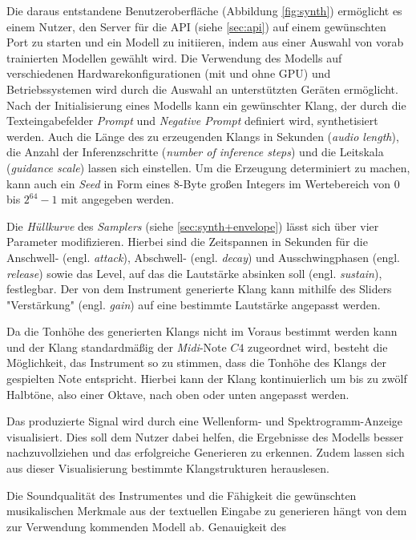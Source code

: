 \documentclass[
  a4paper,  %
  twoside,  %
  bibliography=totoc,
  headsepline,
  cleardoublepage=empty,
  parskip=half,
  draft=false
]{scrbook}
\begin{document}
Die daraus entstandene Benutzeroberfläche (Abbildung \ref{fig:synth}) ermöglicht es einem Nutzer, den Server für die API (siehe \ref{sec:api}) auf einem gewünschten Port  zu starten und ein Modell zu initiieren, indem aus einer Auswahl von vorab trainierten Modellen gewählt wird. Die Verwendung des Modells auf verschiedenen Hardwarekonfigurationen (mit und ohne GPU) und Betriebssystemen wird durch die Auswahl an unterstützten Geräten ermöglicht. Nach der Initialisierung eines Modells kann ein gewünschter Klang, der durch die Texteingabefelder \emph{Prompt} und \emph{Negative Prompt} definiert wird, synthetisiert werden. Auch die Länge des zu erzeugenden Klangs in Sekunden (\emph{audio length}), die Anzahl der Inferenzschritte (\emph{number of inference steps}) und die Leitskala (\emph{guidance scale}) lassen sich einstellen. Um die Erzeugung determiniert zu machen, kann auch ein \emph{Seed} in Form eines 8-Byte großen Integers im Wertebereich von $0$ bis $2^{64}-1$ mit angegeben werden.  

Die \emph{Hüllkurve} des \emph{Samplers} (siehe \ref{sec:synth+envelope}) lässt sich über vier Parameter modifizieren. Hierbei sind die Zeitspannen in Sekunden für die Anschwell- (engl. \emph{attack}), Abschwell- (engl. \emph{decay}) und Ausschwingphasen (engl. \emph{release}) sowie das Level, auf das die Lautstärke absinken soll (engl. \emph{sustain}), festlegbar. Der von dem Instrument generierte Klang kann mithilfe des Sliders "Verstärkung" (engl. \emph{gain}) auf eine bestimmte Lautstärke angepasst werden.

Da die Tonhöhe des generierten Klangs nicht im Voraus bestimmt werden kann und der Klang standardmäßig der \emph{Midi}-Note $C4$ zugeordnet wird, besteht die Möglichkeit, das Instrument so zu stimmen, dass die Tonhöhe des Klangs der gespielten Note entspricht. Hierbei kann der Klang kontinuierlich um bis zu zwölf Halbtöne, also einer Oktave, nach oben oder unten angepasst werden.

Das produzierte Signal wird durch eine Wellenform- und Spektrogramm-Anzeige visualisiert. Dies soll dem Nutzer dabei helfen, die Ergebnisse des Modells besser nachzuvollziehen und das erfolgreiche Generieren zu erkennen. Zudem lassen sich aus dieser Visualisierung bestimmte Klangstrukturen herauslesen.

Die Soundqualität des Instrumentes und die Fähigkeit die gewünschten musikalischen Merkmale aus der textuellen Eingabe zu generieren hängt von dem zur Verwendung kommenden Modell ab.    Genauigkeit des 
\end{document}
